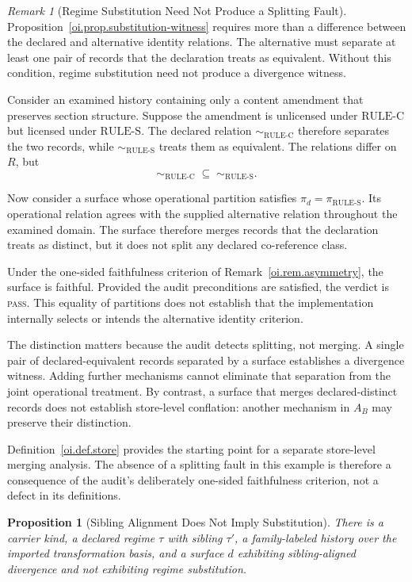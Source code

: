 \documentclass[11pt]{article}
\theoremstyle{plain}
\newtheorem{proposition}[theorem]{Proposition}
\theoremstyle{definition}
\theoremstyle{remark}
\newtheorem{remark}[theorem]{Remark}
\newcommand{\RULEC}{\ensuremath{\mathrm{RULE\text{-}C}}}
\newcommand{\RULES}{\ensuremath{\mathrm{RULE\text{-}S}}}
\newcommand{\PASS}{\textnormal{\textsc{pass}}}
\begin{document}
\begin{remark}[Regime Substitution Need Not Produce a Splitting Fault]
  \label{oi.rem.merging-substitution}
  Proposition~\ref{oi.prop.substitution-witness}
  requires more than a difference between the declared
  and alternative identity relations.
  The alternative must separate at least one pair of records
  that the declaration treats as equivalent.
  Without this condition, regime substitution need not
  produce a divergence witness.

  Consider an examined history containing only a content
  amendment that preserves section structure.
  Suppose the amendment is unlicensed under \RULEC{}
  but licensed under \RULES{}.
  The declared relation \(\sim_{\RULEC}\) therefore
  separates the two records, while
  \(\sim_{\RULES}\) treats them as equivalent.
  The relations differ on \(R\), but
  \[
    \sim_{\RULEC}\;\subseteq\;\sim_{\RULES}.
  \]

  Now consider a surface whose operational partition
  satisfies \(\pi_d=\pi_{\RULES}\).
  Its operational relation agrees with the supplied
  alternative relation throughout the examined domain.
  The surface therefore merges records that the declaration
  treats as distinct, but it does not split any declared
  co-reference class.

  Under the one-sided faithfulness criterion of
  Remark~\ref{oi.rem.asymmetry}, the surface is faithful.
  Provided the audit preconditions are satisfied,
  the verdict is \PASS{}.
  This equality of partitions does not establish that
  the implementation internally selects or intends
  the alternative identity criterion.

  The distinction matters because the audit detects
  splitting, not merging.
  A single pair of declared-equivalent records separated
  by a surface establishes a divergence witness.
  Adding further mechanisms cannot eliminate that
  separation from the joint operational treatment.
  By contrast, a surface that merges declared-distinct
  records does not establish store-level conflation:
  another mechanism in \(A_B\) may preserve their distinction.

  Definition~\ref{oi.def.store} provides the starting point
  for a separate store-level merging analysis.
  The absence of a splitting fault in this example
  is therefore a consequence of the audit's deliberately
  one-sided faithfulness criterion, not a defect
  in its definitions.
\end{remark}

\begin{proposition}[Sibling Alignment Does Not Imply Substitution]
  \label{oi.prop.aligned-not-substitution}
  There is a carrier kind, a declared regime \(\tau\) with sibling \(\tau'\),
  a family-labeled history over the imported transformation basis,
  and a surface \(d\) exhibiting sibling-aligned divergence
  and not exhibiting regime substitution.
\end{proposition}
\end{document}
